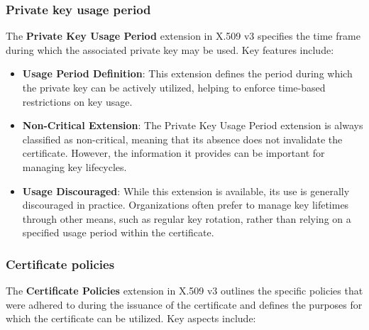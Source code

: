 \subsubsection{Private key usage period}

The \textbf{Private Key Usage Period} extension in X.509 v3 specifies the
time frame during which the associated private key may be used. Key
features include:

\begin{itemize}
  \item \textbf{Usage Period Definition}: This extension defines the
    period during which the private key can be actively utilized,
    helping to enforce time-based restrictions on key usage.

  \item \textbf{Non-Critical Extension}: The Private Key Usage
    Period extension is always classified as non-critical, meaning
    that its absence does not invalidate the certificate. However,
    the information it provides can be important for managing key
    lifecycles.

  \item \textbf{Usage Discouraged}: While this extension is
    available, its use is generally discouraged in practice.
    Organizations often prefer to manage key lifetimes through other
    means, such as regular key rotation, rather than relying on a
    specified usage period within the certificate.
\end{itemize}

\subsubsection{Certificate policies}

The \textbf{Certificate Policies} extension in X.509 v3 outlines the
specific policies that were adhered to during the issuance of the
certificate and defines the purposes for which the certificate can be
utilized. Key aspects include:

